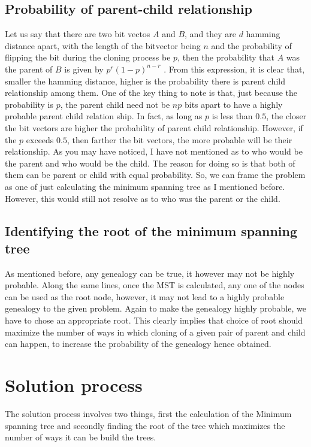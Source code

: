 \documentclass[12pt]{article}
\begin{document}
\subsection{Probability of parent-child relationship}
Let us say that there are two bit vectos $A$ and $B$, and they are $d$ hamming distance apart, with the length of the bitvector being $n$ and the probability of flipping the bit during the cloning process be $p$, then the probability that $A$ was the parent of $B$ is given by $p^r(1-p)^{n-r}$ . From this expression, it is clear that, smaller the hamming distance, higher is the probability there is parent child relationship among them. One of the key thing to note is that, just because the probability is $p$, the parent child need not be $n p$ bits apart to have a highly probable parent child relation ship. In fact, as long as $p$ is less than $0.5$, the closer the bit vectors are higher the probability of parent child relationship. However, if the $p$ exceeds $0.5$, then farther the bit vectors, the more probable will be their relationship. As you may have noticed, I have not mentioned as to who would be the parent and who would be the child. The reason for doing so is that both of them can be parent or child with equal probability. So, we can frame the problem as one of just calculating the minimum spanning tree as I mentioned before. However, this would still not resolve as to who was the parent or the child.
\subsection{Identifying the root of the minimum spanning tree}
As mentioned before, any genealogy can be true, it however may not be highly probable. Along the same lines, once the MST is calculated, any one of the nodes can be used as the root node, however, it may not lead to a highly probable genealogy to the given problem. Again to make the genealogy highly probable, we have to chose an appropriate root. This clearly implies that choice of root should maximize the number of ways in which cloning of a given pair of parent and child can happen, to increase the probability of the genealogy hence obtained.

\section {Solution process}
The solution process involves two things, first the calculation of the Minimum spanning tree and secondly finding the root of the tree which maximizes the number of ways it can be build the trees.
\end{document}
